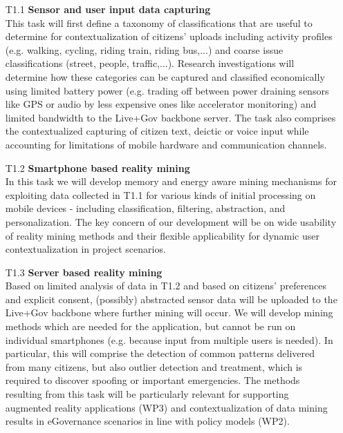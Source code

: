 \documentclass[external]{20120615_deliverable_template_ukob}
\theoremstyle{definition}
\begin{document}
\begin{itemize}
\item[T1.1] {\bf Sensor and user input data capturing} \\
  This task will first define a taxonomy of classifications that are useful to
  determine for contextualization of citizens’ uploads including activity
  profiles (e.g. walking, cycling, riding train, riding bus,...) and coarse
  issue classifications (street, people, traffic,...). Research investigations
  will determine how these categories can be captured and classified
  economically using limited battery power (e.g. trading off between power
  draining sensors like GPS or audio by less expensive ones like accelerator
  monitoring) and limited bandwidth to the Live+Gov backbone server. The task
  also comprises the contextualized capturing of citizen text, deictic or voice
  input while accounting for limitations of mobile hardware and communication
  channels.
\item[T1.2] {\bf Smartphone based reality mining} \\
  In this task we will develop memory and energy aware mining mechanisms for
  exploiting data collected in T1.1 for various kinds of initial processing on
  mobile devices - including classification, filtering, abstraction, and
  personalization. The key concern of our development will be on wide usability
  of reality mining methods and their flexible applicability for dynamic user
  contextualization in project scenarios.
\item[T1.3] {\bf Server based reality mining} \\
  Based on limited analysis of data in T1.2 and based on citizens’ preferences
  and explicit consent, (possibly) abstracted sensor data will be uploaded to
  the Live+Gov backbone where further mining will occur. We will develop mining
  methods which are needed for the application, but cannot be run on individual
  smartphones (e.g.  because input from multiple users is needed). In
  particular, this will comprise the detection of common patterns delivered from
  many citizens, but also outlier detection and treatment, which is required to
  discover spoofing or important emergencies. The methods resulting from this
  task will be particularly relevant for supporting augmented reality
  applications (WP3) and contextualization of data mining results in eGovernance
  scenarios in line with policy models (WP2).
\end{itemize}


\clearpage
\end{document}
